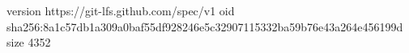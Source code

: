 version https://git-lfs.github.com/spec/v1
oid sha256:8a1c57db1a309a0baf55df928246e5c32907115332ba59b76e43a264e456199d
size 4352
